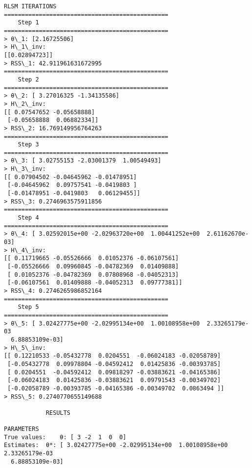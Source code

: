 \documentclass[11pt]{article}
\begin{document}
\begin{Verbatim}[commandchars=\\\{\}]
		RLSM ITERATIONS
===============================================
	Step 1
===============================================
> θ\_1: [2.16725506]
> H\_1\_inv:
[[0.02894723]]
> RSS\_1: 42.911961631672995
===============================================
	Step 2
===============================================
> θ\_2: [ 3.27016325 -1.34135586]
> H\_2\_inv:
[[ 0.07547652 -0.05658888]
 [-0.05658888  0.06882334]]
> RSS\_2: 16.769149956764263
===============================================
	Step 3
===============================================
> θ\_3: [ 3.02755153 -2.03001379  1.00549493]
> H\_3\_inv:
[[ 0.07904502 -0.04645962 -0.01478951]
 [-0.04645962  0.09757541 -0.0419803 ]
 [-0.01478951 -0.0419803   0.06129455]]
> RSS\_3: 0.2746963575911856
===============================================
	Step 4
===============================================
> θ\_4: [ 3.02592015e+00 -2.02963720e+00  1.00441252e+00  2.61162670e-03]
> H\_4\_inv:
[[ 0.11719665 -0.05526666  0.01052376 -0.06107561]
 [-0.05526666  0.09960845 -0.04782369  0.01409888]
 [ 0.01052376 -0.04782369  0.07808968 -0.04052313]
 [-0.06107561  0.01409888 -0.04052313  0.09777381]]
> RSS\_4: 0.2746265986852164
===============================================
	Step 5
===============================================
> θ\_5: [ 3.02427775e+00 -2.02995134e+00  1.00108958e+00  2.33265179e-03
  6.88853109e-03]
> H\_5\_inv:
[[ 0.12210533 -0.05432778  0.0204551  -0.06024183 -0.02058789]
 [-0.05432778  0.09978804 -0.04592412  0.01425836 -0.00393785]
 [ 0.0204551  -0.04592412  0.09818297 -0.03883621 -0.04165386]
 [-0.06024183  0.01425836 -0.03883621  0.09791543 -0.00349702]
 [-0.02058789 -0.00393785 -0.04165386 -0.00349702  0.0863494 ]]
> RSS\_5: 0.2740770655149688

			RESULTS

PARAMETERS
True values:	θ: [ 3 -2  1  0  0]
Estimates:	θ*: [ 3.02427775e+00 -2.02995134e+00  1.00108958e+00  2.33265179e-03
  6.88853109e-03]

    \end{Verbatim}

    \begin{center}
    \end{center}
    { \hspace*{\fill} \\}
    
\end{document}
